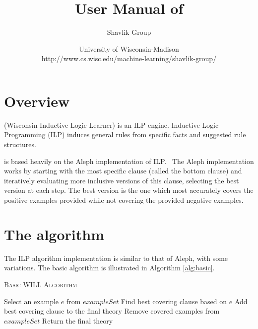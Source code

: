 \documentclass{article}
\begin{document}
\normalem
\title{User Manual of }
\author{
Shavlik Group
\and
%
\begin{minipage}{\textwidth}
  \centering
University of Wisconsin-Madison\\
http://www.cs.wisc.edu/machine-learning/shavlik-group/
\end{minipage}
}
\maketitle


\tableofcontents
\section{Overview}

\will (Wisconsin Inductive Logic Learner) is an ILP engine.  Inductive Logic Programming (ILP) induces general rules from specific facts and suggested rule structures.

\will is based heavily on the Aleph implementation of ILP.~\cite{alephwebsite}  The Aleph implementation works by starting with the most specific clause (called the bottom clause) and iteratively evaluating more inclusive versions of this clause, selecting the best version at each step.  The best version is the one which most accurately covers the positive examples provided while not covering the provided negative examples.

\section{The \will algorithm}

The \will ILP algorithm implementation is similar to that of Aleph, with some variations.  The basic algorithm is illustrated in Algorithm \ref{alg:basic}. 

\begin{algorithm}[h]
\caption{\textsc{Basic WILL Algorithm}}
\label{alg:basic}
\begin{algorithmic}[1]
\STATE Select an example $e$ from $exampleSet$
\STATE Find best covering clause based on $e$ 
\STATE Add best covering clause to the final theory
\STATE Remove covered examples from $exampleSet$
\ENDWHILE
\STATE Return the final theory
\end{algorithmic}
\end{algorithm}
\end{document}
